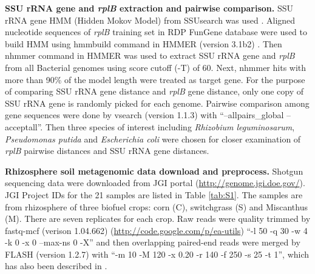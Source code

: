 \documentclass[]{msu-thesis}
\begin{document}
\textbf{SSU rRNA gene and \textit{rplB} extraction and pairwise comparison. }
SSU rRNA gene HMM (Hidden Mokov Model) from SSUsearch was used \cite{guo_microbial_2015}. Aligned nucleotide sequences of \textit{rplB} training set in RDP FunGene database were used to build HMM using hmmbuild command in HMMER (version 3.1b2) \cite{eddy_new_2009}. Then nhmmer command in HMMER was used to extract SSU rRNA gene and \textit{rplB} from all Bacterial genomes using score cutoff (-T) of 60. Next, nhmmer hits with more than 90\% of the model length were treated as target gene. For the purpose of comparing SSU rRNA gene distance and \textit{rplB} gene distance, only one copy of SSU rRNA gene is randomly picked for each genome. Pairwise comparison among gene sequences were done by vsearch (version 1.1.3) with ``--allpairs\_global --acceptall''. Then three species of interest including \textit{\textit{Rhizobium} leguminosarum}, \textit{Pseudomonas putida} and \textit{Escherichia coli} were chosen for closer examination of \textit{rplB} pairwise distances and SSU rRNA gene distances.

\textbf{Rhizosphere soil metagenomic data download and preprocess. }
Shotgun sequencing data were downloaded from JGI portal (\url{http://genome.jgi.doe.gov/}). JGI Project IDs for the 21 samples are listed in Table \ref{tab:S1}. The samples are from rhizosphere of three biofuel crops: corn (C), switchgrass (S) and Miscanthus (M). There are seven replicates for each crop.
Raw reads were quality trimmed by fastq-mcf (verison 1.04.662) (\url{http://code.google.com/p/ea-utils}) ``-l 50 -q 30 -w 4 -k 0 -x 0 --max-ns 0 -X'' and then overlapping paired-end reads were merged by FLASH (version 1.2.7) \cite{magoc_flash:_2011} with ``-m 10 -M 120 -x 0.20 -r 140 -f 250 -s 25 -t 1'', which has also been described in \cite{guo_microbial_2015}. 
\end{document}
